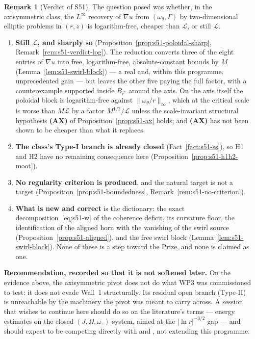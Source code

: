\documentclass[11pt]{article}
\theoremstyle{definition}
\newtheorem{remark}[theorem]{Remark}
\theoremstyle{remark}
\begin{document}
\begin{remark}[Verdict of S51]\label{rem:s51-verdict}
  The question posed was whether, in the axisymmetric class, the $L^\infty$
  recovery of $\nabla u$ from $(\omega_\theta,\Gamma)$ by two-dimensional
  elliptic problems in $(r,z)$ is logarithm-free, cheaper than $\mathcal{L}$,
  or still $\mathcal{L}$.
  \begin{enumerate}[label=\textup{(\arabic*)},leftmargin=2.4em]
  \item \textbf{Still $\mathcal{L}$, and sharply so}
    (Proposition~\ref{prop:s51-poloidal-sharp},
    Remark~\ref{rem:s51-verdict-log}). The reduction converts three of the
    eight entries of $\nabla u$ into free, logarithm-free, absolute-constant
    bounds by $M$ (Lemma~\ref{lem:s51-swirl-block}) --- a real and, within
    this programme, unprecedented gain --- but leaves the other five paying
    the full factor, with a counterexample supported inside $B_{r^*}$ around
    the axis. On the axis itself the poloidal block is logarithm-free against
    $\|\omega_\theta/r\|_\infty$, which at the critical scale is worse than
    $M\mathcal{L}$ by a factor $M^{1/2}/\mathcal{L}$ unless the
    scale-invariant structural hypothesis \textbf{(AX)} of
    Proposition~\ref{prop:s51-ax} holds; and \textbf{(AX)} has not been shown
    to be cheaper than what it replaces.
  \item \textbf{The class's Type-I branch is already closed}
    (Fact~\ref{fact:s51-ss}), so H1 and H2 have no remaining consequence here
    (Proposition~\ref{prop:s51-h1h2-moot}).
  \item \textbf{No regularity criterion is produced}, and the natural target
    is not a target (Proposition~\ref{prop:s51-boundedness},
    Remark~\ref{rem:s51-no-criterion}).
  \item \textbf{What is new and correct} is the dictionary: the exact
    decomposition~\eqref{eq:s51-w} of the coherence deficit, its curvature
    floor, the identification of the aligned horn with the vanishing of the
    swirl source (Proposition~\ref{prop:s51-aligned}), and the free swirl
    block (Lemma~\ref{lem:s51-swirl-block}). None of these is a step toward
    the Prize, and none is claimed as one.
  \end{enumerate}
  \textbf{Recommendation, recorded so that it is not softened later.} On the
  evidence above, the axisymmetric pivot does not do what WP3 was commissioned
  to test: it does not evade Wall~1 structurally. Its residual open branch
  (Type-II) is unreachable by the machinery the pivot was meant to carry
  across. A session that wishes to continue here should do so on the
  literature's terms --- energy estimates on the closed $(J,\Omega,\omega_z)$
  system, aimed at the $|\ln r|^{-3/2}$ gap --- and should expect to be
  competing directly with \cite{LeiZhang2017} and \cite{Wei2016}, not
  extending this programme.
\end{remark}
\end{document}
